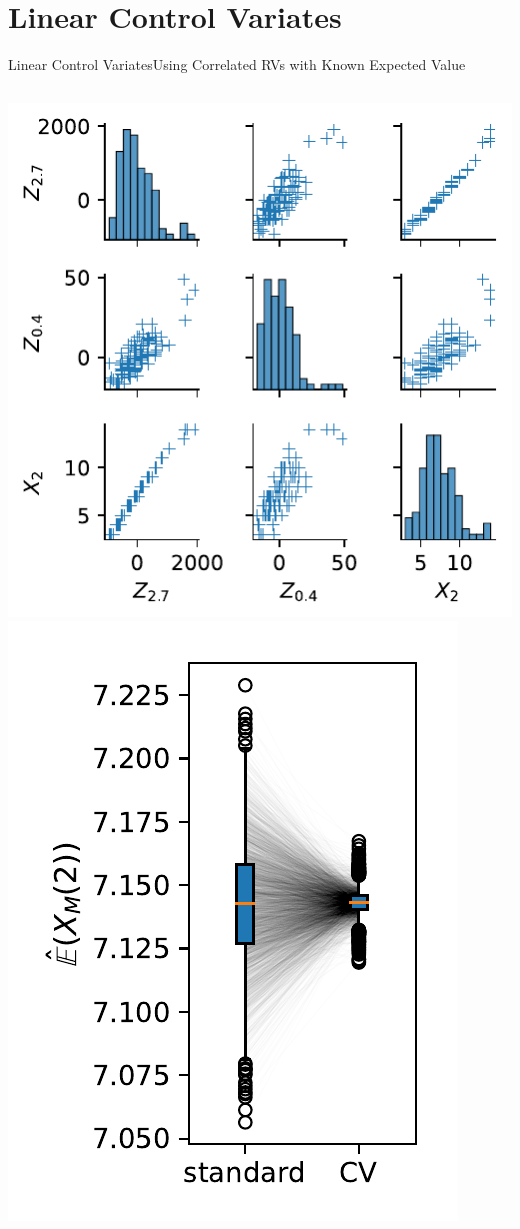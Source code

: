 \documentclass[10pt]{beamer}
\newcommand{\expSym}{{E}}
\newcommand{\E}[1]{\ensuremath{\expSym\left(#1\right)}}
\begin{document}
\section{Linear Control Variates}
\begin{frame}{Linear Control Variates}{Using Correlated RVs with Known Expected Value}
    \begin{columns}
        \begin{column}{.45\paperwidth}
            \centering
                \includegraphics[width=.6\textwidth]{../gfx/correlation.pdf}
                \includegraphics[width=.38\textwidth]{../gfx/reduction.pdf}

\end{column}
\end{columns}
\end{frame}
\end{document}
